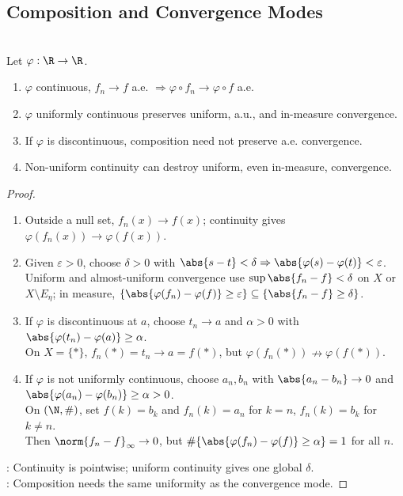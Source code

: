 \subsection{Composition and Convergence Modes}

\begin{proposition} \label{prop:composition-preserves-pointwise-and-almost-uniform-modes} \\
Let $\varphi:\R\to\R$.
\begin{enumerate}[label=(\roman*)]
\setlength{\itemsep}{0pt}
\item $\varphi$ continuous, $f_n\to f$ a.e. $\Rightarrow \varphi\circ f_n\to\varphi\circ f$ a.e.
\item $\varphi$ uniformly continuous preserves uniform, a.u., and in-measure convergence.
\item If $\varphi$ is discontinuous, composition need not preserve a.e. convergence.
\item Non-uniform continuity can destroy uniform, even in-measure, convergence.
\end{enumerate}
\begin{proof}
\begin{enumerate}[label=(\roman*)]
\setlength{\itemsep}{0pt}
\item Outside a null set, $f_n(x)\to f(x)$; continuity gives $\varphi(f_n(x))\to\varphi(f(x))$.
\item Given $\varepsilon>0$, choose $\delta>0$ with $\abs{s-t}<\delta\Rightarrow\abs{\varphi(s)-\varphi(t)}<\varepsilon$. Uniform and almost-uniform convergence use $\sup\abs{f_n-f}<\delta$ on $X$ or $X\setminus E_\eta$; in measure, $\{\abs{\varphi(f_n)-\varphi(f)}\geq\varepsilon\}\subseteq\{\abs{f_n-f}\geq\delta\}$.
\item If $\varphi$ is discontinuous at $a$, choose $t_n\to a$ and $\alpha>0$ with $\abs{\varphi(t_n)-\varphi(a)}\geq\alpha$.\\
On $X=\{\ast\}$, $f_n(\ast)=t_n\to a=f(\ast)$, but $\varphi(f_n(\ast))\nrightarrow\varphi(f(\ast))$.
\item If $\varphi$ is not uniformly continuous, choose $a_n,b_n$ with $\abs{a_n-b_n}\to0$ and $\abs{\varphi(a_n)-\varphi(b_n)}\geq\alpha>0$.\\
On $(\N,\#)$, set $f(k)=b_k$ and $f_n(k)=a_n$ for $k=n$, $f_n(k)=b_k$ for $k\neq n$.\\
Then $\norm{f_n-f}_\infty\to0$, but $\#\{\abs{\varphi(f_n)-\varphi(f)}\geq\alpha\}=1$ for all $n$.
\end{enumerate}
: Continuity is pointwise; uniform continuity gives one global $\delta$.\\
: Composition needs the same uniformity as the convergence mode.
\end{proof}
\end{proposition}

